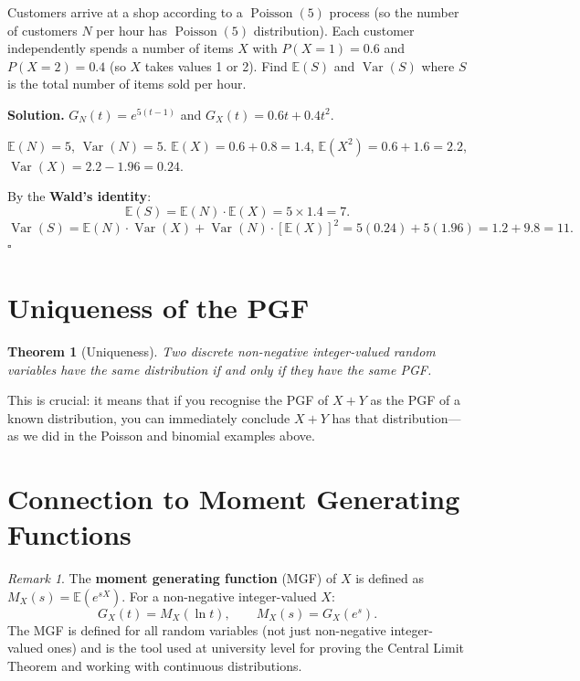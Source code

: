 \documentclass[12pt, a4paper, oneside]{book}
\theoremstyle{definition}
\theoremstyle{plain}
\newtheorem{theorem}{Theorem}[section]
\theoremstyle{remark}
\newtheorem{remark}{Remark}[section]
\newcommand{\E}{\mathbb{E}}
\newcommand{\Var}{\operatorname{Var}}
\newenvironment{solution}
  {\par\medskip\noindent\textbf{Solution.}\quad}
  {\hfill$\square$\par\medskip}
\begin{document}
\begin{workedexample}
Customers arrive at a shop according to a $\operatorname{Poisson}(5)$ process
(so the number of customers $N$ per hour has $\operatorname{Poisson}(5)$
distribution).  Each customer independently spends a number of items $X$
with $P(X=1)=0.6$ and $P(X=2)=0.4$ (so $X$ takes values 1 or 2).  Find
$\E(S)$ and $\Var(S)$ where $S$ is the total number of items sold per hour.

\begin{solution}
$G_N(t)=e^{5(t-1)}$ and $G_X(t)=0.6t+0.4t^2$.

$\E(N)=5$, $\Var(N)=5$.
$\E(X) = 0.6+0.8=1.4$, $\E(X^2)=0.6+1.6=2.2$, $\Var(X)=2.2-1.96=0.24$.

By the \textbf{Wald's identity}:
\[
  \E(S) = \E(N)\cdot\E(X) = 5\times1.4 = 7.
\]
\[
  \Var(S) = \E(N)\cdot\Var(X) + \Var(N)\cdot[\E(X)]^2
  = 5(0.24) + 5(1.96) = 1.2 + 9.8 = 11.
\]
\end{solution}
\end{workedexample}

\section{Uniqueness of the PGF}

\begin{theorem}[Uniqueness]
Two discrete non-negative integer-valued random variables have the same
distribution if and only if they have the same PGF.
\end{theorem}

This is crucial: it means that if you recognise the PGF of $X+Y$ as the
PGF of a known distribution, you can immediately conclude $X+Y$ has that
distribution---as we did in the Poisson and binomial examples above.

\section{Connection to Moment Generating Functions}

\begin{remark}
The \textbf{moment generating function} (MGF) of $X$ is defined as
$M_X(s) = \E(e^{sX})$.  For a non-negative integer-valued $X$:
\[
  G_X(t) = M_X(\ln t), \qquad M_X(s) = G_X(e^s).
\]
The MGF is defined for all random variables (not just non-negative
integer-valued ones) and is the tool used at university level for proving
the Central Limit Theorem and working with continuous distributions.
\end{remark}
\end{document}
